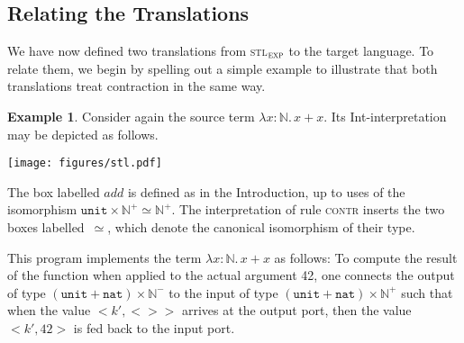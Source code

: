 \documentclass{LMCS}
\theoremstyle{definition}
\newtheorem{example}[thm]{Example}
\theoremstyle{plain}
\newcommand{\NN}{\mathbb{N}}
\newcommand{\unit}{\mathtt{unit}}
\newcommand{\VN}{\mathtt{nat}}
\newcommand{\R}[1]{\textsc{#1}}
\newcommand{\tlami}[3]{\lambda {#1}{:}{#2}.\, {#3}}
\newcommand{\iso}{\simeq}
\newcommand{\stlexp}{\textsc{stl}$_\textsc{exp}$\xspace}
\begin{document}
\subsection{Relating the Translations}
We have now defined two translations from \stlexp to the target language.
To relate them, we begin by spelling out a simple example to illustrate that both
translations treat contraction in the same way. 

\begin{example}
Consider again the source term 
$\tlami x \NN {x + x}$.
Its Int-interpretation may be depicted as follows.
\begin{center}
  \texttt{[image: figures/stl.pdf]}
\end{center}
The box labelled $\mathit{add}$ is defined as in the Introduction, up to
uses of the isomorphism $\unit \times \NN^+ \iso \NN^+$.
The interpretation of rule \R{contr} inserts the two boxes labelled~$\simeq$,
which denote the canonical isomorphism of their type.

This program implements the term $\tlami x \NN {x + x}$ as follows: 
To compute the result of the function when applied to the actual argument 42, one
connects the output of type $(\unit+\VN)\times \NN^-$ to the input of type
$(\unit+\VN)\times \NN^+$ such that when the value $<k',<>>$ arrives at
the output port, then the value $<k',42>$ is fed back to the input
port. 


\end{example}
\end{document}
